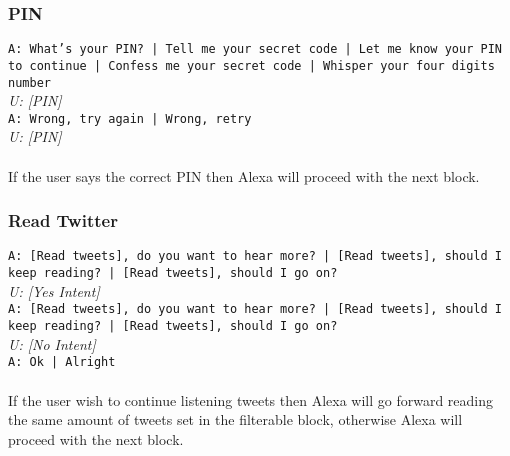 \subsubsection{PIN}
\texttt{A: What's your PIN? | Tell me your secret code | Let me know your PIN to continue | Confess me your secret code | Whisper your four digits number}\\
\textit{U: [PIN] }\\
\texttt{A: Wrong, try again | Wrong, retry }\\
\textit{U: [PIN]}\\\\
If the user says the correct PIN then Alexa will proceed with the next block.

\subsubsection{Read Twitter}
\texttt{A: [Read tweets], do you want to hear more? | [Read tweets], should I keep reading? | [Read tweets], should I go on?}\\
\textit{U: [Yes Intent]}\\
\texttt{A: [Read tweets], do you want to hear more? | [Read tweets], should I keep reading? | [Read tweets], should I go on?}\\
\textit{U: [No Intent]}\\
\texttt{A: Ok | Alright}\\\\
If the user wish to continue listening tweets then Alexa will go forward reading the same amount of tweets set in the filterable block, otherwise Alexa will proceed with the next block.

